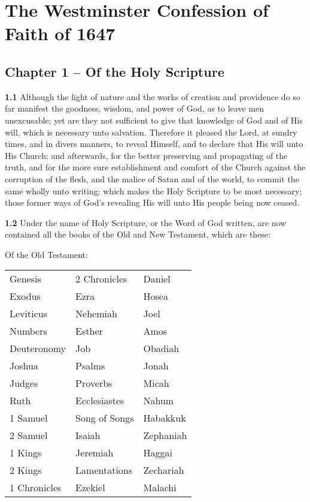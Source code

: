 \chapter{The Westminster Confession of Faith of 1647} 

\section{Chapter 1 -- Of the Holy Scripture} 

\par\textbf{1.1} Although the light of nature and the works of creation and providence do so far manifest the goodness, wisdom, and power of God, as to leave men unexcusable; yet are they not sufficient to give that knowledge of God and of His will, which is necessary unto salvation. Therefore it pleased the Lord, at sundry times, and in divers manners, to reveal Himself, and to declare that His will unto His Church; and afterwards, for the better preserving and propagating of the truth, and for the more sure establishment and comfort of the Church against the corruption of the flesh, and the malice of Satan and of the world, to commit the same wholly unto writing: which makes the Holy Scripture to be most necessary; those former ways of God's revealing His will unto His people being now ceased.   

\par\textbf{1.2} Under the name of Holy Scripture, or the Word of God written, are now contained all the books of the Old and New Testament, which are these:

\begin{samepage}
\par Of the Old Testament:
\begin{center}
  \begin{tabular}{ p{4cm} p{4cm} p{4cm} }
    Genesis & 2 Chronicles & Daniel \\
    Exodus & Ezra & Hosea \\
    Leviticus & Nehemiah & Joel \\
    Numbers & Esther & Amos \\
    Deuteronomy & Job & Obadiah \\
    Joshua & Psalms & Jonah \\
    Judges & Proverbs & Micah \\
    Ruth & Ecclesiastes & Nahum \\
    1 Samuel & Song of Songs & Habakkuk \\
    2 Samuel & Isaiah & Zephaniah \\
    1 Kings & Jeremiah & Haggai \\
    2 Kings & Lamentations & Zechariah \\
    1 Chronicles & Ezekiel & Malachi \\
  \end{tabular}
\end{center}
\end{samepage}

